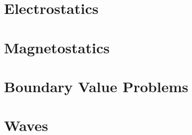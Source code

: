 \section{Electrostatics}
\section{Magnetostatics}
\section{Boundary Value Problems}
\section{Waves}
